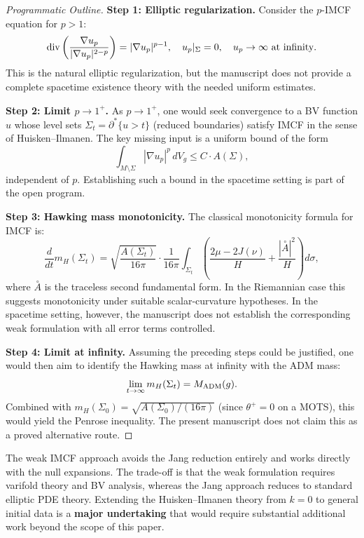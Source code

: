 \begin{proof}[Programmatic Outline]
\textbf{Step 1: Elliptic regularization.}
Consider the $p$-IMCF equation for $p > 1$:
\begin{equation}
    \mathrm{div}\left( \frac{\nabla u_p}{|\nabla u_p|^{2-p}} \right) = |\nabla u_p|^{p-1}, \quad u_p|_\Sigma = 0, \quad u_p \to \infty \text{ at infinity}.
\end{equation}
This is the natural elliptic regularization, but the manuscript does not provide a complete spacetime existence theory with the needed uniform estimates.

\textbf{Step 2: Limit $p \to 1^+$.}
As $p \to 1^+$, one would seek convergence to a BV function $u$ whose level sets $\Sigma_t = \partial^* \{u > t\}$ (reduced boundaries) satisfy IMCF in the sense of Huisken--Ilmanen. The key missing input is a uniform bound of the form
\begin{equation}
    \int_{M \setminus \Sigma} |\nabla u_p|^p \, dV_g \le C \cdot A(\Sigma),
\end{equation}
independent of $p$. Establishing such a bound in the spacetime setting is part of the open program.

\textbf{Step 3: Hawking mass monotonicity.}
The classical monotonicity formula for IMCF is:
\begin{equation}
    \frac{d}{dt} m_H(\Sigma_t) = \sqrt{\frac{A(\Sigma_t)}{16\pi}} \cdot \frac{1}{16\pi} \int_{\Sigma_t} \left( \frac{2\mu - 2J(\nu)}{H} + \frac{|\overset{\circ}{A}|^2}{H} \right) d\sigma,
\end{equation}
where $\overset{\circ}{A}$ is the traceless second fundamental form. In the Riemannian case this suggests monotonicity under suitable scalar-curvature hypotheses. In the spacetime setting, however, the manuscript does not establish the corresponding weak formulation with all error terms controlled.

\textbf{Step 4: Limit at infinity.}
Assuming the preceding steps could be justified, one would then aim to identify the Hawking mass at infinity with the ADM mass:
\begin{equation}
    \lim_{t \to \infty} m_H(\Sigma_t) = M_{\mathrm{ADM}}(g).
\end{equation}
Combined with $m_H(\Sigma_0) = \sqrt{A(\Sigma_0)/(16\pi)}$ (since $\theta^+ = 0$ on a MOTS), this would yield the Penrose inequality. The present manuscript does not claim this as a proved alternative route.
\end{proof}

\begin{remark}
The weak IMCF approach avoids the Jang reduction entirely and works directly with the null expansions. The trade-off is that the weak formulation requires varifold theory and BV analysis, whereas the Jang approach reduces to standard elliptic PDE theory. Extending the Huisken--Ilmanen theory from $k=0$ to general initial data is a \textbf{major undertaking} that would require substantial additional work beyond the scope of this paper.
\end{remark}

